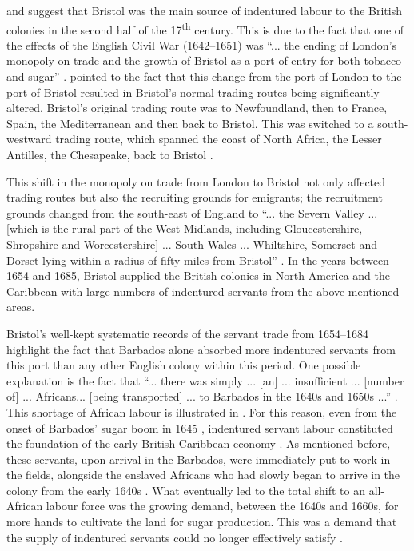 \label{6.2.1.1.2}
\citet{Beckles89} and \citet{Sacks93} suggest that Bristol was the main source of indentured labour to the British colonies in the second half of the 17\textsuperscript{th} century. This is due to the fact that one of the effects of the English Civil War (1642--1651) was ``... the ending of London's monopoly on trade and the growth of Bristol as a port of entry for both tobacco and sugar'' \citep[137]{Currer82}. \citet{Currer82} pointed to the fact that this change from the port of London to the port of Bristol resulted in Bristol's normal trading routes being significantly altered. Bristol's original trading route was to Newfoundland, then to France, Spain, the Mediterranean and then back to Bristol. This was switched to a south-westward trading route, which spanned the coast of North Africa, the Lesser Antilles, the Chesapeake, back to Bristol \citep{Currer82}.

This shift in the monopoly on trade from London to Bristol not only affected trading routes but also the recruiting grounds for emigrants; the recruitment grounds changed from the south-east of England to ``... the Severn Valley ... [which is the rural part of the West Midlands, including Gloucestershire, Shropshire and Worcestershire] ... South Wales ... Whiltshire, Somerset and Dorset lying within a radius of fifty miles from Bristol'' \citep[138]{Currer82}. In the years between 1654 and 1685, Bristol supplied the British colonies in North America and the Caribbean with large numbers of indentured servants from the above-mentioned areas.

Bristol's well-kept systematic records of the servant trade from 1654--1684 \citep{Beckles89} highlight the fact that Barbados alone absorbed more indentured servants from this port than any other English colony \citep{Beckles89} within this period. One possible explanation is the fact that ``... there was simply ... [an] ... insufficient ... [number of] ... Africans... [being transported] ... to Barbados in the 1640s and 1650s ...'' \citep[379]{Morgan11}. This shortage of African labour is illustrated in . For this reason, even from the onset of Barbados' sugar boom in 1645 \citep{Elias10}, indentured servant labour constituted the foundation of the early British Caribbean economy \citep{Morgan11}. As mentioned before, these servants, upon arrival in the Barbados, were immediately put to work in the fields, alongside the enslaved Africans who had slowly began to arrive in the colony from the early 1640s \citep{Brewer96, Galenson02, Amussen09}. What eventually led to the total shift to an all-African labour force was the growing demand, between the 1640s and 1660s, for more hands to cultivate the land for sugar production. This was a demand that the supply of indentured servants could no longer effectively satisfy \citep{Morgan11}.

